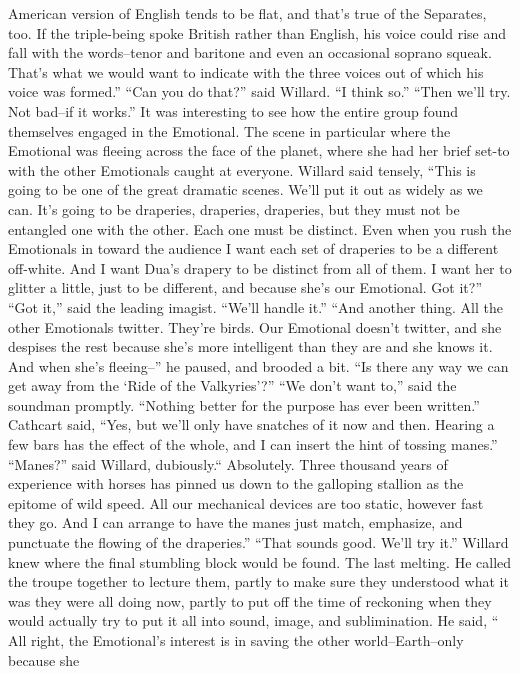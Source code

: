 \documentclass[a4paper,12pt]{article}
\begin{document}
American version of English tends to be flat, and that’s true of the Separates, too. If the triple-being spoke
British rather than English, his voice could rise and fall with the words--tenor and baritone and even an
occasional soprano squeak. That’s what we would want to indicate with the three voices out of which his
voice was formed.”
“Can you do that?” said Willard.
“I think so.”
“Then we’ll try. Not bad--if it works.”
It was interesting to see how the entire group found themselves engaged in the Emotional.
The scene in particular where the Emotional was fleeing across the face of the planet, where she
had her brief set-to with the other Emotionals caught at everyone.
Willard said tensely, “This is going to be one of the great dramatic scenes. We’ll put it out as
widely as we can. It’s going to be draperies, draperies, draperies, but they must not be entangled one with
the other. Each one must be distinct. Even when you rush the Emotionals in toward the audience I want
each set of draperies to be a different off-white. And I want Dua’s drapery to be distinct from all of them. I
want her to glitter a little, just to be different, and because she’s our Emotional. Got it?”
“Got it,” said the leading imagist. “We’ll handle it.”
“And another thing. All the other Emotionals twitter. They’re birds. Our Emotional doesn’t
twitter, and she despises the rest because she’s more intelligent than they are and she knows it. And when
she’s fleeing--” he paused, and brooded a bit. “Is there any way we can get away from the ‘Ride of the
Valkyries’?”
“We don’t want to,” said the soundman promptly. “Nothing better for the purpose has ever been
written.”
Cathcart said, “Yes, but we’ll only have snatches of it now and then. Hearing a few bars has the
effect of the whole, and I can insert the hint of tossing manes.”
“Manes?” said Willard, dubiously.“
Absolutely. Three thousand years of experience with horses has pinned us down to the galloping
stallion as the epitome of wild speed. All our mechanical devices are too static, however fast they go. And I
can arrange to have the manes just match, emphasize, and punctuate the flowing of the draperies.”
“That sounds good. We’ll try it.”
Willard knew where the final stumbling block would be found. The last melting. He called the
troupe together to lecture them, partly to make sure they understood what it was they were all doing now,
partly to put off the time of reckoning when they would actually try to put it all into sound, image, and
sublimination.
He said, “ All right, the Emotional’s interest is in saving the other world--Earth--only because she
\end{document}
